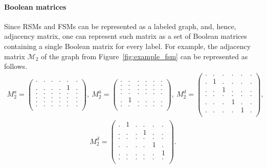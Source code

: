 \paragraph*{Boolean matrices}
Since RSMs and FSMs can be represented as a labeled graph, and, hence, adjacency matrix, one can represent such matrix as a set of Boolean matrices containing a single Boolean matrix for every label. For example, the adjacency matrix $\mathcal{M}_2$ of the graph from Figure~\ref{fig:example_fsm} can be represented as follows.
{\small
\begin{align*}
M_2^a =
\begin{pmatrix}
. & . & .  &.  & .  &.     \\
.& .&.  &. & 1   &.     \\
. & . & .  & . &.  &.     \\
. & .& . &. & . &.   \\
. &  . &. & .   & . &.      \\
. & . & .  & .  &. &.    \\
\end{pmatrix},~M_2^{\bar{a}} =
\begin{pmatrix}
. & . & .  &.  & .  &.     \\
.& .&.  &. & .   &.     \\
. & . & .  & . &.  &.     \\
. & .& . &. & . &.   \\
. &  1 &. & .   & . &.      \\
. & . & .  & .  &. &.    \\
\end{pmatrix},
~M_2^{d} =
\begin{pmatrix}
. & . & .  &.  & .  &.     \\
.& 1&.  &. & .   &.     \\
. & . & 1  & . &.  &.     \\
. & .& . &. & . &.   \\
. &  . &. & 1   & . &.      \\
. & . & .  & .  & 1 &.    \\
\end{pmatrix},
\end{align*}
}
{\small
\begin{align*}M_2^{\bar{d}}=
\begin{pmatrix}
. & 1 & .  &.  & .  &.     \\
.& .&.  & 1 & .   &.     \\
. & . & .  & . &.  &.     \\
. & .& . &. & 1 &.   \\
. &  . &. & .   & . & 1      \\
. & . & .  & .  &. &.    \\
\end{pmatrix}.
\end{align*}
}
 

